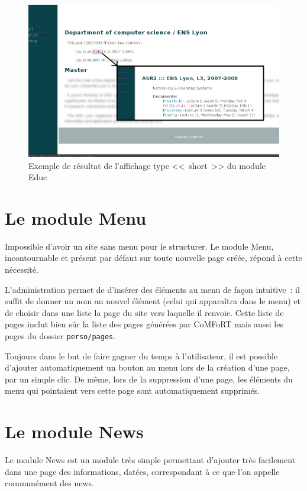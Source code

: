 \documentclass[final,11pt,a4paper,twoside,titlepage]{article}
\newcommand{\p}{\vspace{0.3em}}
\newcommand{\code}[1]{\texttt{#1}}
\begin{document}
{    \begin{figure}[htbp]
      \centering
      \includegraphics[width=16cm]{display_educ.png}
      \caption{\footnotesize Exemple de résultat de l'affichage type <<~short~>> du module Educ}
    \end{figure}
    
  \section{Le module Menu}
    Impossible d'avoir un site sans menu pour le structurer. Le module Menu,
    incontournable et présent par défaut sur toute nouvelle page créée, répond à
    cette nécessité. \p

    L'administration permet de d'insérer des éléments au menu de façon intuitive~: il
    suffit de donner un nom au nouvel élément (celui qui apparaîtra dans le menu) et
    de choisir dans une liste la page du site vers laquelle il renvoie. Cette liste
    de pages inclut bien sûr la liste des pages générées par CoMFoRT mais aussi les
    pages du dossier \code{perso/pages}. \p

    Toujours dans le but de faire gagner du temps à l'utilisateur,
    il est possible d'ajouter automatiquement un bouton au
    menu lors de la création d'une page, par un simple clic. De même, lors de la
    suppression d'une page, les éléments du menu qui pointaient vers cette page sont
    automatiquement supprimés.

  \section{Le module News}
    Le module News est un module très simple permettant d'ajouter très facilement
    dans une page des informations, datées, correspondant à ce que l'on appelle
    communément des news.  \p
    
}
\end{document}
